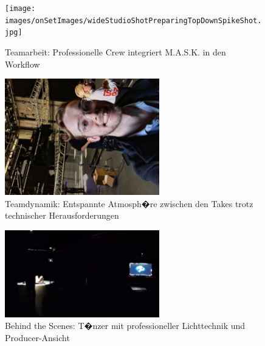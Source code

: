 \begin{figure}[!htbp]
   \centering
   \texttt{[image: images/onSetImages/wideStudioShotPreparingTopDownSpikeShot.jpg]}
   \caption{Teamarbeit: Professionelle Crew integriert M.A.S.K. in den Workflow}
   \label{fig:crew_setup}
\end{figure}

\begin{figure}[!htbp]
   \centering
   \includegraphics[width=0.6\textwidth,height=0.25\textheight,keepaspectratio]{images/onSetImages/MartySmileyIntoCameraOnSet.jpg}
   \caption{Teamdynamik: Entspannte Atmosph�re zwischen den Takes trotz technischer Herausforderungen}
   \label{fig:team_atmosphere}
\end{figure}

\begin{figure}[!htbp]
   \centering
   \includegraphics[width=0.6\textwidth,height=0.25\textheight,keepaspectratio]{images/BTS_TopDown_DancerAndProducer.png}
   \caption{Behind the Scenes: T�nzer mit professioneller Lichttechnik und Producer-Ansicht}
   \label{fig:studio_wide}
\end{figure}